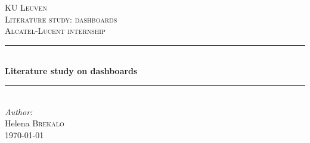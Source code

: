 \documentclass[10pt,a4paper]{report}
\begin{document}
\begin{titlepage}

\newcommand{\HRule}{\rule{\linewidth}{0.5mm}} %

\center %
 
\textsc{\LARGE KU Leuven}\\[1.5cm] %
\textsc{\Large Literature study: dashboards}\\[0.5cm] %
\textsc{\large Alcatel-Lucent internship}\\[0.5cm] %


\HRule \\[0.4cm]
{ \huge \bfseries Literature study on dashboards}\\[0.4cm]
\HRule \\[1.5cm]
 

\Large \emph{Author:}\\
Helena \textsc{Brekalo}\\[3cm]

{\large \today}\\[3cm] %

\vfill %

\end{titlepage}
\end{document}
